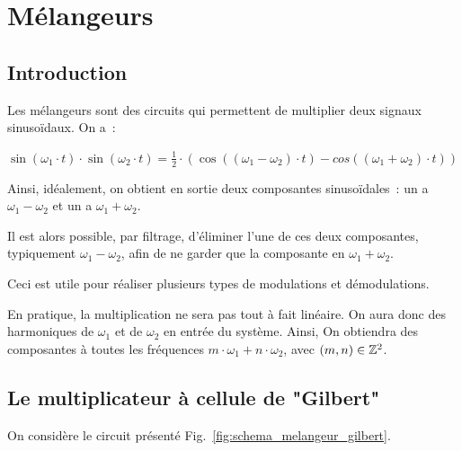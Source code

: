 \documentclass{article}
\begin{document}
\section{Mélangeurs}

\subsection{Introduction}
\label{subsec:mel_intro}

Les mélangeurs sont des circuits qui permettent de multiplier deux signaux sinusoïdaux.
On a~:
\begin{center}
$\sin(\omega_{1}\cdot t)\cdot \sin(\omega_{2}\cdot t) = \frac{1}{2}\cdot(\cos((\omega_{1} - \omega_{2})\cdot t) - cos((\omega_{1} + \omega_{2})\cdot t ) )$
\end{center}

Ainsi, idéalement, on obtient en sortie deux composantes sinusoïdales~: un a ${\omega_{1} - \omega_{2}}$ et un a ${\omega_{1} + \omega_{2}}$.

Il est alors possible, par filtrage, d'éliminer l'une de ces deux composantes, typiquement $\omega_{1} - \omega_{2}$, afin de ne garder que la composante en $\omega_{1} + \omega_{2}$.

Ceci est utile pour réaliser plusieurs types de modulations et démodulations.

En pratique, la multiplication ne sera pas tout à fait linéaire. On aura donc des harmoniques de $\omega_{1}$ et de $\omega_{2}$ en entrée du système.
Ainsi, On obtiendra des composantes à toutes les fréquences $m \cdot \omega_{1} + n \cdot \omega_{2}$, avec $(m, n) \in\mathbb{Z}^2$.


\subsection{Le multiplicateur à cellule de "Gilbert"}

On considère le circuit présenté Fig.~\ref{fig:schema_melangeur_gilbert}.
\end{document}

